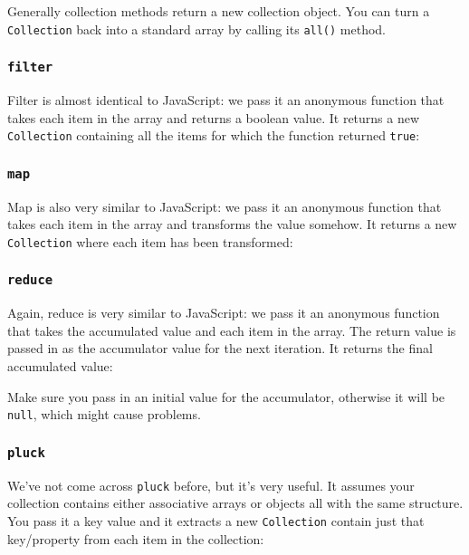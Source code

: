 Generally collection methods return a new collection object. You can turn a \texttt{Collection} back into a standard array by calling its \texttt{all()} method.

\subsubsection{\texttt{filter}}

Filter is almost identical to JavaScript: we pass it an anonymous function that takes each item in the array and returns a boolean value. It returns a new \texttt{Collection} containing all the items for which the function returned \texttt{true}:


\subsubsection{\texttt{map}}

Map is also very similar to JavaScript: we pass it an anonymous function that takes each item in the array and transforms the value somehow. It returns a new \texttt{Collection} where each item has been transformed:


\subsubsection{\texttt{reduce}}

Again, reduce is very similar to JavaScript: we pass it an anonymous function that takes the accumulated value and each item in the array. The return value is passed in as the accumulator value for the next iteration. It returns the final accumulated value:


Make sure you pass in an initial value for the accumulator, otherwise it will be \texttt{null}, which might cause problems.

\subsubsection{\texttt{pluck}}

We've not come across \texttt{pluck} before, but it's very useful. It assumes your collection contains either associative arrays or objects all with the same structure. You pass it a key value and it extracts a new \texttt{Collection} contain just that key/property from each item in the collection:


